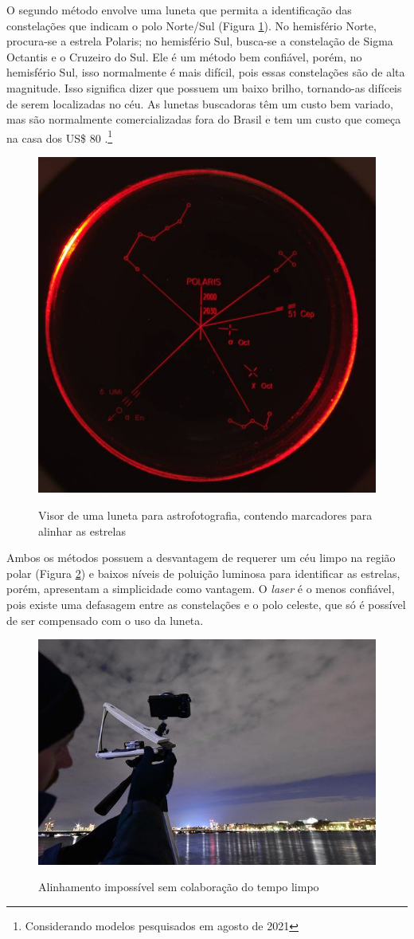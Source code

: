 O segundo método envolve uma luneta que permita a identificação das constelações que indicam o polo Norte/Sul (Figura \ref{fig:luneta}). No hemisfério Norte, procura-se a estrela Polaris; no hemisfério Sul, busca-se a constelação de Sigma Octantis e o Cruzeiro do Sul. Ele é um método bem confiável, porém, no hemisfério Sul, isso normalmente é mais difícil, pois essas constelações são de alta magnitude. Isso significa dizer que possuem um baixo brilho, tornando-as difíceis de serem localizadas no céu. As lunetas buscadoras têm um custo bem variado, mas são normalmente comercializadas fora do Brasil e tem um custo que começa na casa dos US\$ 80 .\footnote{Considerando modelos pesquisados em agosto de 2021}

 \begin{figure}[!htb]
	\centering
	\caption{Visor de uma luneta para astrofotografia, contendo marcadores para alinhar as estrelas}
	\includegraphics[width=0.5\linewidth]{figuras/luneta}
	\label{fig:luneta}
\end{figure}

Ambos os métodos possuem a desvantagem de requerer um céu limpo na região polar (Figura \ref{fig:temporuim}) e baixos níveis de poluição luminosa para identificar as estrelas, porém, apresentam a simplicidade como vantagem. O \textit{laser} é o menos confiável, pois existe uma defasagem entre as constelações e o polo celeste, que só é possível de ser compensado com o uso da luneta. 

 \begin{figure}[!htb]
	\centering
	\caption{Alinhamento impossível sem colaboração do tempo limpo}
	\includegraphics[width=0.5\linewidth]{figuras/temporuim}
	\label{fig:temporuim}
\end{figure}


